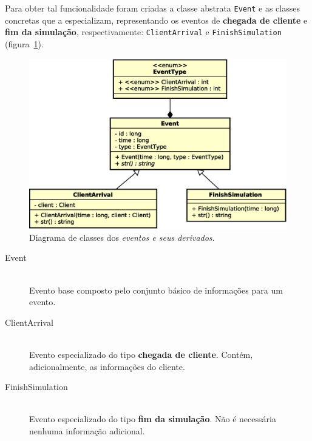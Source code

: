 Para obter tal funcionalidade foram criadas a classe abstrata \texttt{Event} e
as classes concretas que a especializam, representando os eventos de
\textbf{chegada de cliente} e \textbf{fim da simulação}, respectivamente:
\texttt{ClientArrival} e \texttt{FinishSimulation}
(figura~\ref{fig:diagram:events}).

\begin{figure}[htb!]
  \centering
  \includegraphics[scale=0.6]{img/Events}
  \caption{Diagrama de classes dos \textit{eventos e seus derivados}.}
\label{fig:diagram:events}
\end{figure}

\begin{description}
  \item[Event] \hfill \\
    Evento base composto pelo conjunto básico de informações para um evento.


  \item[ClientArrival] \hfill \\
    Evento especializado do tipo \textbf{chegada de cliente}. Contém,
    adicionalmente, as informações do cliente.


  \item[FinishSimulation] \hfill \\
    Evento especializado do tipo \textbf{fim da simulação}. Não é necessária
    nenhuma informação adicional.
\end{description}

